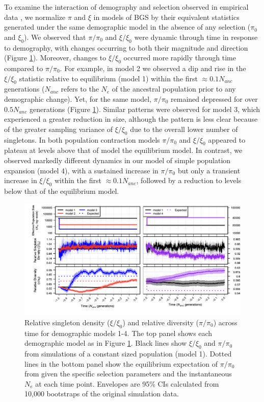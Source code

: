 \documentclass[9pt,twocolumn,twoside]{rilabRxiv}
\begin{document}
To examine the interaction of demography and selection observed in empirical data \citep{beissinger2016recent,torres2018human}, we normalize $\pi$ and $\xi$ in models of BGS by their equivalent statistics generated under the same demographic model in the absence of any selection ($\pi_0$ and $\xi_0$).
We observed that $\pi/\pi_0$ and $\xi/\xi_0$ were dynamic through time in response to demography, with changes occurring to both their magnitude and direction (Figure \ref{fig:1}).
Moreover, changes to $\xi/\xi_0$ occurred more rapidly through time compared to $\pi/\pi_0$.
For example, in model 2 we observed a dip and rise in the $\xi/\xi_0$ statistic relative to equilibrium (model 1) within the first $\approx 0.1N_{anc}$ generations ($N_{anc}$ refers to the $N_e$ of the ancestral population prior to any demographic change).
Yet, for the same model, $\pi/\pi_0$ remained depressed for over $0.5N_{anc}$ generations (Figure \ref{fig:1}).
Similar patterns were observed for model 3, which experienced a greater reduction in size, although the pattern is less clear because of the greater sampling variance of $\xi/\xi_0$ due to the overall lower number of singletons.
In both population contraction models  $\pi/\pi_0$ and $\xi/\xi_0$ appeared to plateau at levels above that of model the equilibrium model.
In contrast, we observed markedly different dynamics in our model of simple population expansion (model 4), with a sustained increase in $\pi/\pi_0$ but only a transient increase in $\xi/\xi_0$ within the first $\approx 0.1N_{anc}$, followed by a reduction to levels below that of the equilibrium model.

\begin{figure}[]
\includegraphics[width=\linewidth]{figures/tempF1.png}
\caption{Relative singleton density ($\xi/\xi_0$) and relative diversity ($\pi/\pi_0$) across time for demographic models 1-4.
The top panel shows each demographic model as in Figure \ref{fig:1}.
Black lines show $\xi/\xi_0$ and $\pi/\pi_0$ from simulations of a constant sized population (model 1).
Dotted lines in the bottom panel show the equilibrium  expectation of $\pi/\pi_0$ from  \citet{nordborg1996effect} given the specific selection parameters and the instantaneous $N_e$ at each time point.
Envelopes are 95\% CIs calculated from 10,000 bootstraps of the original simulation data.}
\label{fig:1}
\end{figure}
\end{document}
